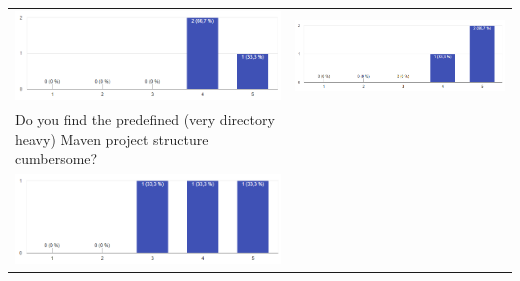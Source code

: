 \begin{center}
\begin{tabular}{ p{8.7cm} p{8.7cm} }
    \includegraphics[width=\linewidth]{images/survey/java3}
    &
    \includegraphics[width=\linewidth]{images/survey/java4}\\[1cm]
    
    Do you find the predefined (very directory heavy) Maven project structure
    cumbersome? & \\
    
    \includegraphics[width=\linewidth]{images/survey/java5}
    & \\
  \end{tabular}
\end{center}


